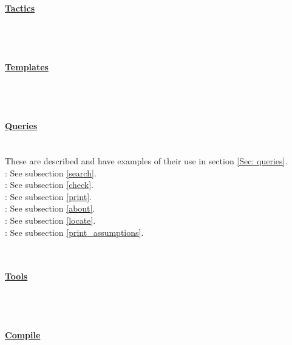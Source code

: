 	
~\\
\paragraph{\underline{Tactics}}
~\\




	
~\\
\paragraph{\underline{Templates}}
~\\




	
~\\
\paragraph{\underline{Queries}}
~\\
These are described and have examples of their use in section \ref{Sec: queries}. 
\\
 : See subsection \ref{search}. 
\\
 : See subsection \ref{check}. 
\\
 : See subsection \ref{print}. 
\\
 : See subsection \ref{about}. 
\\
 : See subsection \ref{locate}. 
\\
 : See subsection \ref{print_assumptions}. 



	
~\\
\paragraph{\underline{Tools}}
~\\




	
~\\
\paragraph{\underline{Compile}}
~\\





